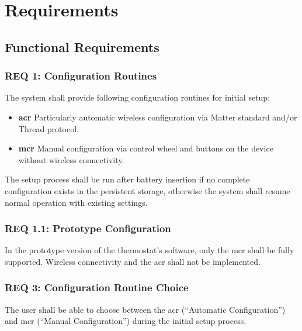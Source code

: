 %
%

\chapter{Requirements}
\label{chap:Requirements}

\section{Functional Requirements}
\label{sec:Functional Requirements}

\subsection*{REQ 1: Configuration Routines}
\label{subsec:REQ 1: Configuration Routines}
The system shall provide following configuration routines for initial setup:
\begin{itemize}
    \item \textbf{\ac{acr}} Particularly automatic wireless configuration via Matter standard and/or Thread protocol.
    \item \textbf{\ac{mcr}} Manual configuration via control wheel and buttons on the device without wireless connectivity.
\end{itemize}
The setup process shall be run after battery insertion if no complete configuration exists in the persistent storage, otherwise the system shall resume normal operation with existing settings. 

\subsection*{REQ 1.1: Prototype Configuration}
\label{subsec:REQ 1.1: Prototype Configuration}
In the prototype version of the thermostat's software, only the \acs{mcr} shall be fully supported. Wireless connectivity and the \acs{acr} shall not be implemented.

\subsection*{REQ 3: Configuration Routine Choice}
\label{subsec:REQ 3: Configuration Routine Choice}
The user shall be able to choose between the \acs{acr} (``Automatic Configuration'') and \acs{mcr} (``Manual Configuration'') during the initial setup process.


